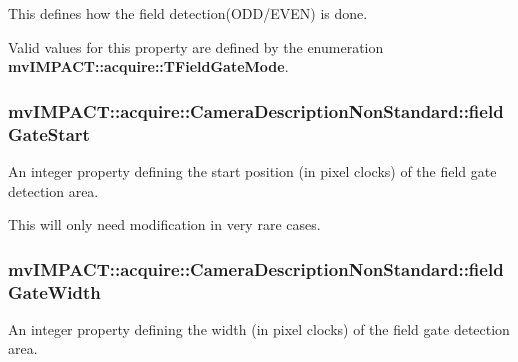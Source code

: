 This defines how the field detection(O\+D\+D/\+E\+V\+E\+N) is done.

Valid values for this property are defined by the enumeration {\bfseries mv\+I\+M\+P\+A\+C\+T\+::acquire\+::\+T\+Field\+Gate\+Mode}. \hypertarget{classmv_i_m_p_a_c_t_1_1acquire_1_1_camera_description_non_standard_a1974cb5221b4ace734c8f36502ff95cd}{
\subsubsection[{field\+Gate\+Start}]{ mv\+I\+M\+P\+A\+C\+T\+::acquire\+::\+Camera\+Description\+Non\+Standard\+::field\+Gate\+Start}}\label{classmv_i_m_p_a_c_t_1_1acquire_1_1_camera_description_non_standard_a1974cb5221b4ace734c8f36502ff95cd}


An integer property defining the start position (in pixel clocks) of the field gate detection area. 

This will only need modification in very rare cases. \hypertarget{classmv_i_m_p_a_c_t_1_1acquire_1_1_camera_description_non_standard_a82b6254a0535520f563521d5826a4921}{
\subsubsection[{field\+Gate\+Width}]{ mv\+I\+M\+P\+A\+C\+T\+::acquire\+::\+Camera\+Description\+Non\+Standard\+::field\+Gate\+Width}}\label{classmv_i_m_p_a_c_t_1_1acquire_1_1_camera_description_non_standard_a82b6254a0535520f563521d5826a4921}


An integer property defining the width (in pixel clocks) of the field gate detection area. 


